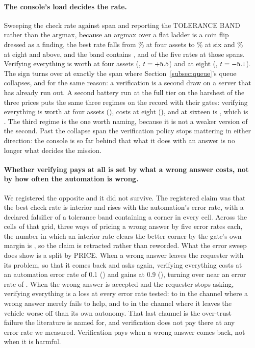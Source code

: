 \documentclass[11pt]{article}
\begin{document}
\paragraph{The console's load decides the rate.} Sweeping the check rate against span and reporting
the TOLERANCE BAND rather than the argmax, because an argmax over a flat ladder is a coin flip
dressed as a finding, the best rate falls from \TbFourBest\% at four assets to \TbSixBest\% at six
and \TbEightBest\% at eight and above, and the band contains \TbFourWidth{}, \TbSixWidth{} and
\TbEightWidth{} of the five rates at those spans. Verifying everything is worth \TrLow{} at four
assets (\TrLowV{}, $t = +5.5{}$) and \TrColl{} at eight (\TrCollV{}, $t = -5.1{}$). The sign
turns over at exactly the span where Section~\ref{subsec:queue}'s queue collapses, and for the same
reason: a verification is a second draw on a server that has already run out. A second battery run
at the full tier on the harshest of the three prices puts the same three regimes on the record with
their gates: verifying everything is worth \DrLoadFour{} at four assets (\DrLoadFourV{}), costs
\DrLoadEight{} at eight (\DrLoadEightV{}), and at sixteen is \DrLoadSixteen{}, which is
\DrLoadSixteenV{}. The third regime is the one worth naming, because it is not a weaker version of
the second. Past the collapse span the verification policy stops mattering in either direction: the
console is so far behind that what it does with an answer is no longer what decides the mission.

\paragraph{Whether verifying pays at all is set by what a wrong answer costs, not by how often the
automation is wrong.} We registered the opposite and it did not survive. The registered claim was
that the best check rate is interior and rises with the automation's error rate, with a declared
falsifier of a tolerance band containing a corner in every cell. Across the \DrCells{} cells of
that grid, three ways of pricing a wrong answer by five error rates each, the number in which an
interior rate clears the better corner by the gate's own margin is \DrInterior{}, so the claim is
retracted rather than reworded. What the error sweep does show is a split by PRICE. When a
wrong answer leaves the requester with its problem, so that it comes back and asks again, verifying
everything costs \TpTimeLo{} at an automation error rate of 0.1 (\TpTimeLoV{}) and
gains \TpTimeHi{} at 0.9 (\TpTimeHiV{}), turning over near an error rate of
\TpTimeFlip{}. When the wrong answer is accepted and the requester stops asking, verifying
everything is a loss at every error rate tested: \TpWeakLo{} to \TpWeakHi{} in the channel where a
wrong answer merely fails to help, and \TpReflLo{} to \TpReflHi{} in the channel where it leaves the
vehicle worse off than its own autonomy. That last channel is the over-trust failure the literature
is named for, and verification does not pay there at any error rate we measured. Verification pays
when a wrong answer comes back, not when it is harmful.
\end{document}
